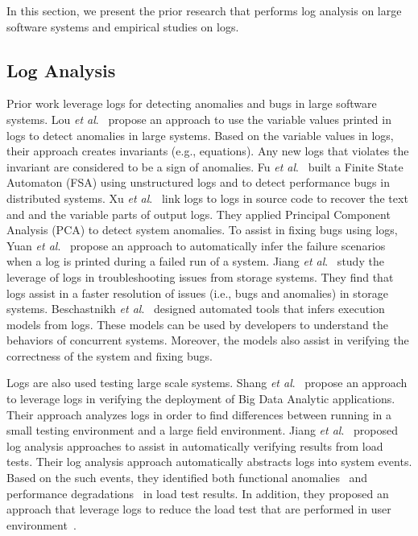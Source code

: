In this section, we present the prior research that performs log analysis on large software systems and empirical studies on logs. 


\subsection{Log Analysis}

Prior work leverage logs for detecting anomalies and bugs in large software systems. Lou \textsl{et al}$.$~\cite{JGLouMining} propose an approach to use the variable values printed in logs to detect anomalies in large systems. Based on the variable values in logs, their approach creates invariants (e.g., equations). Any new logs that violates the invariant are considered to be a sign of anomalies. Fu \textsl{et al}$.$~\cite{QFuanomaly} built a Finite State Automaton (FSA) using unstructured logs and to detect performance bugs in distributed systems. Xu \textsl{et al$.$}~\cite{ConsoleLogs} link logs to logs in source code to recover the text and and the variable parts of output logs. They applied Principal Component Analysis (PCA) to detect system anomalies. To assist in fixing bugs using logs, Yuan \emph{et al$.$}~\cite{Yuan:2010:SED:1736020.1736038} propose an approach to automatically infer the failure scenarios when a log is printed during a failed run of a system. Jiang \textsl{et al}$.$~\cite{Jiang:2009:UCP:1525908.1525912} study the leverage of logs in troubleshooting issues from storage systems. They find that logs assist in a faster resolution of issues (i.e., bugs and anomalies) in storage systems. Beschastnikh \textsl{et al}$.$~\cite{Beschastnikh:2011:LEI:2025113.2025151} designed automated tools that infers execution models from logs. These models can be used by developers to understand the behaviors of concurrent systems. Moreover, the models also assist in verifying the correctness of the system and fixing bugs.

Logs are also used testing large scale systems. Shang\textsl{ et al$.$}~\cite{IanContextinformation} propose an approach to leverage logs in verifying the deployment of Big Data Analytic applications. Their approach analyzes logs in order to find differences between running in a small testing environment and a large field environment. Jiang \textsl{et al$.$}~\cite{Jiang:2008:AAA:1400155.1400158,JiangICSM2008,JiangICSM20092,Jiang:2010:ICS:1850000.1850068} proposed log analysis approaches to assist in automatically verifying results from load tests. Their log analysis approach automatically abstracts logs into system events. Based on the such events, they identified both functional anomalies~\cite{JiangICSM2008} and performance degradations~\cite{JiangICSM20092} in load test results. In addition, they proposed an approach that leverage logs to reduce the load test that are performed in user environment~\cite{Jiang:2010:ICS:1850000.1850068}.


